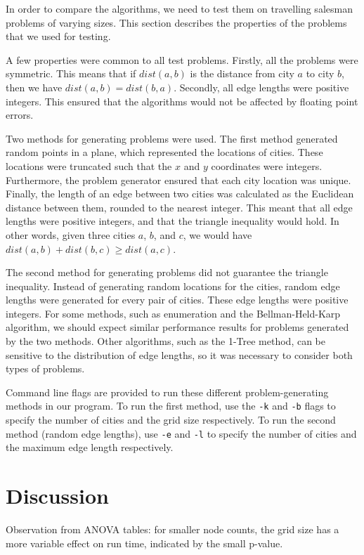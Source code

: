 \documentclass[11pt]{article}
\begin{document}
In order to compare the algorithms, we need to test them on travelling salesman problems of varying sizes. This section describes the properties of the problems that we used for testing.

A few properties were common to all test problems. Firstly, all the problems were symmetric. This means that if $dist(a,b)$ is the distance from city $a$ to city $b$, then we have $dist(a,b) = dist(b,a)$. Secondly, all edge lengths were positive integers. This ensured that the algorithms would not be affected by floating point errors.

Two methods for generating problems were used. The first method generated random points in a plane, which represented the locations of cities. These locations were truncated such that the $x$ and $y$ coordinates were integers. Furthermore, the problem generator ensured that each city location was unique. Finally, the length of an edge between two cities was calculated as the Euclidean distance between them, rounded to the nearest integer. This meant that all edge lengths were positive integers, and that the triangle inequality would hold. In other words, given three cities $a$, $b$, and $c$, we would have $dist(a,b) + dist(b,c) \geq dist(a,c)$.

The second method for generating problems did not guarantee the triangle inequality. Instead of generating random locations for the cities, random edge lengths were generated for every pair of cities. These edge lengths were positive integers. For some methods, such as enumeration and the Bellman-Held-Karp algorithm, we should expect similar performance results for problems generated by the two methods. Other algorithms, such as the 1-Tree method, can be sensitive to the distribution of edge lengths, so it was necessary to consider both types of problems.

Command line flags are provided to run these different problem-generating methods in our program. To run the first method, use the \texttt{-k} and \texttt{-b} flags to specify the number of cities and the grid size respectively. To run the second method (random edge lengths), use \texttt{-e} and \texttt{-l} to specify the number of cities and the maximum edge length respectively.

\section{Discussion}
\label{sec:discussion}
Observation from ANOVA tables: for smaller node counts, the grid size has a more variable effect on run time, indicated by the small p-value. 
\end{document}
